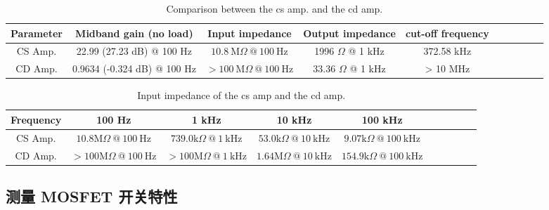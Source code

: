 \documentclass[UTF8]{article}
\begin{document}
\begin{table}[H]\centering
    \caption{Comparison between the cs amp. and the cd amp.}
    \label{table: comparison between the cs amp. and the cd amp.}
    \begin{tabular}{cccccccccc}\toprule
        Parameter & Midband gain (no load) & Input impedance & Output impedance & cut-off frequency & \\
        \midrule
        CS Amp. & 22.99 (27.23 dB) @ 100 Hz & $10.8\ \mathrm{M}\Omega\ @\ 100 \ \mathrm{Hz}$ & 1996 $\Omega$ @ 1 kHz & 372.58 kHz \\
        CD Amp. & 0.9634 (-0.324 dB) @ 100 Hz & $> 100\ \mathrm{M}\Omega\ @\ 100 \ \mathrm{Hz}$ & 33.36 $\Omega$ @ 1 kHz & > 10 MHz \\
        \bottomrule
    \end{tabular}
\end{table}

\begin{table}[H]\centering
    \caption{Input impedance of the cs amp and the cd amp.}
    \label{table: input impedance of the cs amp and the cd amp.}
\begin{tabular}{cccccccccc}\toprule
    Frequency & 100 Hz & 1 kHz & 10 kHz & 100 kHz \\
    \midrule
    CS Amp. 
        & $10.8 \mathrm{M}\Omega\ @\ 100 \ \mathrm{Hz}$ 
        & $739.0 \mathrm{k}\Omega\ @\ 1 \ \mathrm{kHz}$ 
        & $53.0 \mathrm{k}\Omega\ @\ 10 \ \mathrm{kHz}$
        & $9.07 \mathrm{k}\Omega\ @\ 100 \ \mathrm{kHz}$
    \\
    CD Amp. 
        & $> 100 \mathrm{M}\Omega\ @\ 100 \ \mathrm{Hz}$
        & $> 100 \mathrm{M}\Omega\ @\ 1 \ \mathrm{kHz}$
        & $1.64 \mathrm{M}\Omega\ @\ 10 \ \mathrm{kHz}$
        & $154.9 \mathrm{k}\Omega\ @\ 100 \ \mathrm{kHz}$
    \\
    \bottomrule
\end{tabular}\end{table}

\subsection{测量 MOSFET 开关特性}
\end{document}

